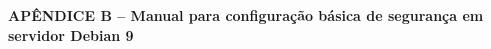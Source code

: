\begin{center}
  \normalsize{\textbf{APÊNDICE B -- Manual para configuração básica de segurança em servidor Debian 9}}
\end{center}

\pagestyle{empty} %

\begin{figure}
    
\end{figure}

\newpage

\begin{figure}
    
\end{figure}
